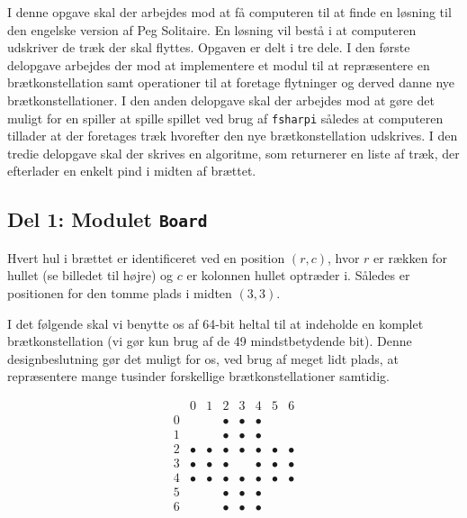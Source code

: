 

I denne opgave skal der arbejdes mod at få computeren til at finde en
løsning til den engelske version af Peg Solitaire. En løsning vil
bestå i at computeren udskriver de træk der skal flyttes. Opgaven er
delt i tre dele. I den første delopgave arbejdes der mod at
implementere et modul til at repræsentere en brætkonstellation samt
operationer til at foretage flytninger og derved danne nye
brætkonstellationer. I den anden delopgave skal der arbejdes mod at
gøre det muligt for en spiller at spille spillet ved brug
af \texttt{fsharpi} således at computeren tillader at der foretages træk
hvorefter den nye brætkonstellation udskrives. I den tredie delopgave skal
der skrives en algoritme, som returnerer en liste af træk, der
efterlader en enkelt pind i midten af brættet.

\subsection*{Del 1: Modulet \lstinline{Board}}
\begin{minipage}{.65\textwidth}
Hvert hul i brættet er identificeret ved en position $(r,c)$, hvor $r$
er rækken for hullet (se billedet til højre) og $c$ er kolonnen hullet
optræder i. Således er positionen for den tomme plads i midten
$(3,3)$.

I det følgende skal vi benytte os af 64-bit heltal til at indeholde en
komplet brætkonstellation (vi gør kun brug af de 49 mindstbetydende
bit). Denne designbeslutning gør det muligt for os, ved brug af meget
lidt plads, at repræsentere mange tusinder forskellige
brætkonstellationer samtidig.
\end{minipage}
\begin{minipage}{.3\textwidth}
\[
\begin{array}{r|c|c|c|c|c|c|c}
  & 0 & 1 & 2 & 3 & 4 & 5 & 6 \\ \hline
0 & & & \bullet & \bullet & \bullet & & \\ \hline
1 & & & \bullet & \bullet & \bullet & & \\ \hline
2 & \bullet & \bullet & \bullet & \bullet & \bullet & \bullet & \bullet \\ \hline
3 & \bullet & \bullet & \bullet &  & \bullet & \bullet & \bullet \\ \hline
4 & \bullet & \bullet & \bullet & \bullet & \bullet & \bullet & \bullet \\ \hline
5 & & & \bullet & \bullet & \bullet & & \\ \hline
6 & & & \bullet & \bullet & \bullet & &
\end{array}
\]
\end{minipage}

